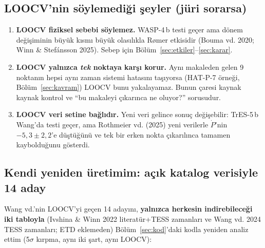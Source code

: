 \subsection{LOOCV'nin söylemediği şeyler (jüri sorarsa)}
\begin{dikkat}
\begin{enumerate}[leftmargin=*]
\item \textbf{LOOCV fiziksel sebebi söylemez.} WASP-4\,b testi geçer ama dönem değişiminin büyük kısmı büyük
      olasılıkla Rømer etkisidir (Bouma vd. 2020; Winn \& Stefánsson 2025). Sebep için Bölüm~\ref{sec:etkiler}–\ref{sec:karar}.
\item \textbf{LOOCV yalnızca \emph{tek} noktaya karşı korur.} Aynı makaleden gelen 9 noktanın hepsi aynı zaman
      sistemi hatasını taşıyorsa (HAT-P-7 örneği, Bölüm~\ref{sec:kavram}) LOOCV bunu yakalayamaz. Bunun çaresi
      kaynak kaynak kontrol ve “bu makaleyi çıkarınca ne oluyor?” sorusudur.
\item \textbf{LOOCV veri setine bağlıdır.} Yeni veri gelince sonuç değişebilir: TrES-5\,b Wang'da testi geçer, ama
      Rothmeier vd. (2025) yeni verilerle $\dot P$'nin $-5{,}3\pm2{,}2$\msyil'e düştüğünü ve tek bir erken nokta
      çıkarılınca tamamen kaybolduğunu gösterdi.
\end{enumerate}
\end{dikkat}

\subsection{Kendi yeniden üretimim: açık katalog verisiyle 14 aday}
Wang vd.'nin LOOCV'yi geçen 14 adayını, \textbf{yalnızca herkesin indirebileceği iki tabloyla} (Ivshina \& Winn
2022 literatür+TESS zamanları ve Wang vd. 2024 TESS zamanları; ETD eklemeden) Bölüm~\ref{sec:kod}'daki kodla
yeniden analiz ettim (5$\sigma$ kırpma, aynı iki şart, aynı LOOCV):

